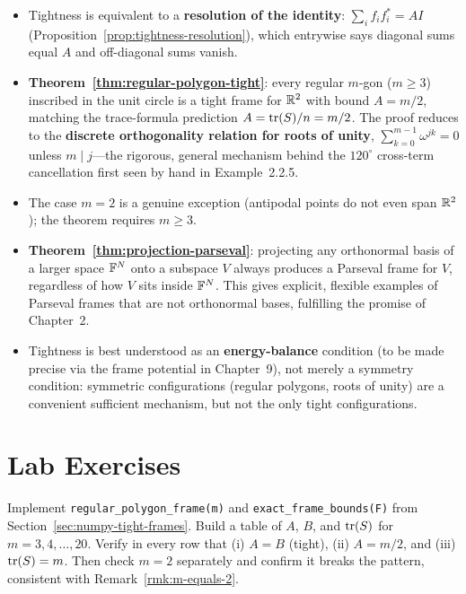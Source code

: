\begin{itemize}
  \item Tightness is equivalent to a \textbf{resolution of the
        identity}: $\sum_i f_if_i^* = AI$
        (Proposition~\ref{prop:tightness-resolution}), which entrywise
        says diagonal sums equal $A$ and off-diagonal sums vanish.
  \item \textbf{Theorem~\ref{thm:regular-polygon-tight}}: every regular
        $m$-gon ($m\ge3$) inscribed in the unit circle is a tight frame
        for $\mathbb{R}^2$ with bound $A=m/2$, matching the trace-formula
        prediction $A=\operatorname{tr}(S)/n=m/2$. The proof reduces to the
        \textbf{discrete orthogonality relation for roots of unity},
        $\sum_{k=0}^{m-1}\omega^{jk}=0$ unless $m\mid j$---the rigorous,
        general mechanism behind the $120^\circ$ cross-term cancellation
        first seen by hand in Example~2.2.5.
  \item The case $m=2$ is a genuine exception (antipodal points do not
        even span $\mathbb{R}^2$); the theorem requires $m\ge3$.
  \item \textbf{Theorem~\ref{thm:projection-parseval}}: projecting any
        orthonormal basis of a larger space $\mathbb{F}^N$ onto a subspace $V$
        always produces a Parseval frame for $V$, regardless of how $V$
        sits inside $\mathbb{F}^N$. This gives explicit, flexible examples of
        Parseval frames that are not orthonormal bases, fulfilling the
        promise of Chapter~2.
  \item Tightness is best understood as an \textbf{energy-balance}
        condition (to be made precise via the frame potential in
        Chapter~9), not merely a symmetry condition: symmetric
        configurations (regular polygons, roots of unity) are a
        convenient sufficient mechanism, but not the only tight
        configurations.
\end{itemize}

\section{Lab Exercises}
\label{sec:lab-ch4}

\begin{exercisebox}[title={Lab Exercise 4.1: The Full Regular Polygon Table}]
Implement \texttt{regular\_polygon\_frame(m)} and
\texttt{exact\_frame\_bounds(F)} from
Section~\ref{sec:numpy-tight-frames}. Build a table of $A$, $B$, and
$\operatorname{tr}(S)$ for $m=3,4,\ldots,20$. Verify in every row that (i) $A=B$
(tight), (ii) $A=m/2$, and (iii) $\operatorname{tr}(S)=m$. Then check $m=2$ separately
and confirm it breaks the pattern, consistent with
Remark~\ref{rmk:m-equals-2}.
\end{exercisebox}

